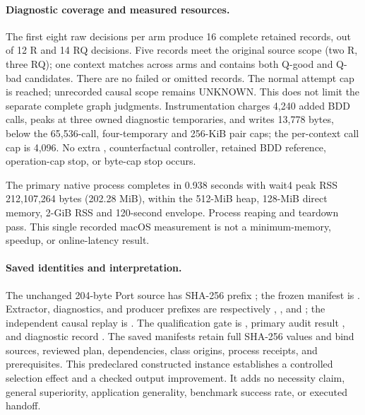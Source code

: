 \paragraph{Diagnostic coverage and measured resources.}
The first eight raw decisions per arm produce 16 complete retained
records, out of 12 R and 14 RQ decisions. Five records meet the original
source scope (two R, three RQ); one context matches across arms and
contains both Q-good and Q-bad candidates. There are no failed or
omitted records. The normal attempt cap is reached; unrecorded causal
scope remains UNKNOWN. This does not limit the separate complete graph
judgments. Instrumentation charges 4,240 added BDD calls, peaks at three
owned diagnostic temporaries, and writes 13,778 bytes, below the
65,536-call, four-temporary and 256-KiB pair caps; the per-context call
cap is 4,096. No extra , counterfactual controller, retained
BDD reference, operation-cap stop, or byte-cap stop occurs.

The primary native process completes in 0.938 seconds with wait4 peak
RSS 212,107,264 bytes (202.28 MiB), within the 512-MiB heap, 128-MiB direct
memory, 2-GiB RSS and 120-second envelope. Process reaping and teardown
pass. This single recorded macOS measurement is not a minimum-memory,
speedup, or online-latency result.

\paragraph{Saved identities and interpretation.}
The unchanged 204-byte Port source has SHA-256 prefix
; the frozen manifest is .
Extractor, diagnostics, and producer prefixes are respectively
, , and ;
the independent causal replay is .
The qualification gate is , primary audit result
, and diagnostic record .
The saved manifests retain full SHA-256 values and bind sources,
reviewed plan, dependencies, class origins, process receipts, and
prerequisites. This predeclared constructed instance establishes a
controlled selection effect and a checked output improvement. It adds
no necessity claim, general superiority, application generality,
benchmark success rate, or executed handoff.
